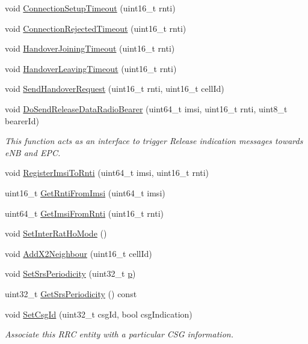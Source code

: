 \begin{DoxyCompactItemize}
\item 
void \hyperlink{classns3_1_1LteEnbRrc_ac0af0fbbf09bc66c0ebd5be00c69aa7c}{Connection\+Setup\+Timeout} (uint16\+\_\+t rnti)
\item 
void \hyperlink{classns3_1_1LteEnbRrc_accc2939d256646bf19abd915f13c0d68}{Connection\+Rejected\+Timeout} (uint16\+\_\+t rnti)
\item 
void \hyperlink{classns3_1_1LteEnbRrc_a8374075a52ca40290d3f15e253ef94ff}{Handover\+Joining\+Timeout} (uint16\+\_\+t rnti)
\item 
void \hyperlink{classns3_1_1LteEnbRrc_a3ded0535ab2c7f5b1346cf787745d06d}{Handover\+Leaving\+Timeout} (uint16\+\_\+t rnti)
\item 
void \hyperlink{classns3_1_1LteEnbRrc_aafad8f02e2086dafea2bc4b48793a392}{Send\+Handover\+Request} (uint16\+\_\+t rnti, uint16\+\_\+t cell\+Id)
\item 
void \hyperlink{classns3_1_1LteEnbRrc_a19a585bb51e164c158770b853af00129}{Do\+Send\+Release\+Data\+Radio\+Bearer} (uint64\+\_\+t imsi, uint16\+\_\+t rnti, uint8\+\_\+t bearer\+Id)
\begin{DoxyCompactList}\small\item\em This function acts as an interface to trigger Release indication messages towards e\+NB and E\+PC. \end{DoxyCompactList}\item 
void \hyperlink{classns3_1_1LteEnbRrc_a892009f50761e0c6a8c4a8f8fb0860be}{Register\+Imsi\+To\+Rnti} (uint64\+\_\+t imsi, uint16\+\_\+t rnti)
\item 
uint16\+\_\+t \hyperlink{classns3_1_1LteEnbRrc_a98f4b8f727e844ab621e447b7178ddc2}{Get\+Rnti\+From\+Imsi} (uint64\+\_\+t imsi)
\item 
uint64\+\_\+t \hyperlink{classns3_1_1LteEnbRrc_a1a1a3c1703bd1d39d4fcd0657788d1bd}{Get\+Imsi\+From\+Rnti} (uint16\+\_\+t rnti)
\item 
void \hyperlink{classns3_1_1LteEnbRrc_a3c9a7904d80eb487bd2c79ab72463fd7}{Set\+Inter\+Rat\+Ho\+Mode} ()
\item 
void \hyperlink{classns3_1_1LteEnbRrc_a39d5217760bc5e30306d68cf9bee4a77}{Add\+X2\+Neighbour} (uint16\+\_\+t cell\+Id)
\item 
void \hyperlink{classns3_1_1LteEnbRrc_a13441a98e6d9b590a777735d6fb7909d}{Set\+Srs\+Periodicity} (uint32\+\_\+t \hyperlink{lte__link__budget__x2__handover__measures_8m_ac9de518908a968428863f829398a4e62}{p})
\item 
uint32\+\_\+t \hyperlink{classns3_1_1LteEnbRrc_a6e253c788b5406e81fc163da669e9445}{Get\+Srs\+Periodicity} () const 
\item 
void \hyperlink{classns3_1_1LteEnbRrc_a0b52ff352180698b5b3ee1018345d37f}{Set\+Csg\+Id} (uint32\+\_\+t csg\+Id, bool csg\+Indication)
\begin{DoxyCompactList}\small\item\em Associate this R\+RC entity with a particular C\+SG information. \end{DoxyCompactList}\end{DoxyCompactItemize}

